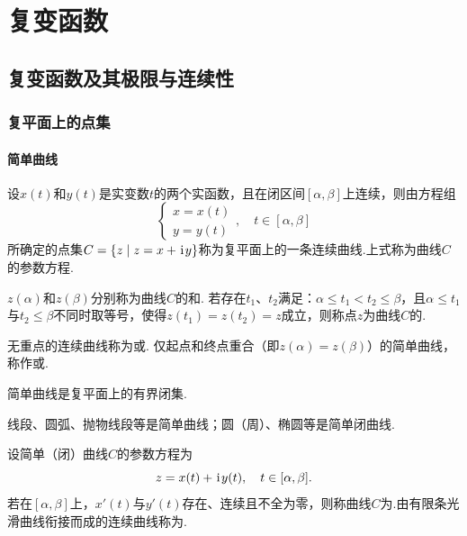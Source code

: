 \chapter{复变函数}
\section{复变函数及其极限与连续性}
\subsection{复平面上的点集}
\subsubsection{简单曲线}
\begin{definition}
设\(x(t)\)和\(y(t)\)是实变数\(t\)的两个实函数，且在闭区间\([\alpha,\beta]\)上连续，则由方程组\begin{equation*}
\left\{ \begin{array}{l}
x = x(t) \\
y = y(t)
\end{array} \right., \quad t \in [\alpha,\beta]
\end{equation*}所确定的点集\(C = \{ z \mid z = x + \kern1pt\mathrm{i}\kern1pt y \}\)称为复平面上的一条连续曲线.上式称为曲线\(C\)的参数方程.

\(z(\alpha)\)和\(z(\beta)\)分别称为曲线\(C\)的和.
若存在\(t_1\)、\(t_2\)满足：\(\alpha \leq t_1 < t_2 \leq \beta\)，且\(\alpha \leq t_1\)与\(t_2 \leq \beta\)不同时取等号，使得\(z(t_1) = z(t_2) = z\)成立，则称点\(z\)为曲线\(C\)的.

无重点的连续曲线称为或.
仅起点和终点重合（即\(z(\alpha)=z(\beta)\)）的简单曲线，称作或.
\end{definition}

\begin{property}
简单曲线是复平面上的有界闭集.
\end{property}

\begin{example}
线段、圆弧、抛物线段等是简单曲线；圆（周）、椭圆等是简单闭曲线.
\end{example}

\begin{definition}
设简单（闭）曲线\(C\)的参数方程为\begin{equation*}
z = x(t) + \kern1pt\mathrm{i}\kern1pt y(t), \quad t \in [\alpha,\beta].
\end{equation*}若在\([\alpha,\beta]\)上，\(x'(t)\)与\(y'(t)\)存在、连续且不全为零，则称曲线\(C\)为.由有限条光滑曲线衔接而成的连续曲线称为.
\end{definition}

